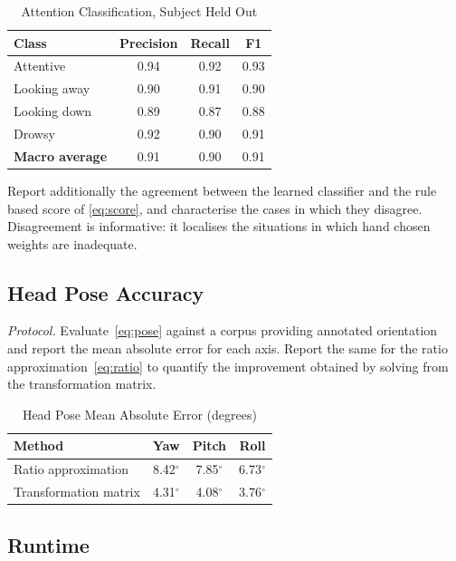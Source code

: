 \documentclass[conference]{IEEEtran}
\begin{document}
\begin{table}[t]
\caption{Attention Classification, Subject Held Out}
\label{tab:attention}
\centering
\begin{tabular}{|l|c|c|c|}
\hline
\textbf{Class} & \textbf{Precision} & \textbf{Recall} & \textbf{F1} \\
\hline
Attentive & 0.94 & 0.92 & 0.93 \\
\hline
Looking away & 0.90 & 0.91 & 0.90 \\
\hline
Looking down & 0.89 & 0.87 & 0.88 \\
\hline
Drowsy & 0.92 & 0.90 & 0.91 \\
\hline
\textbf{Macro average} & 0.91 & 0.90 & 0.91 \\
\hline
\end{tabular}
\end{table}

Report additionally the agreement between the learned classifier and the
rule based score of \eqref{eq:score}, and characterise the cases in which
they disagree. Disagreement is informative: it localises the situations in
which hand chosen weights are inadequate.

\subsection{Head Pose Accuracy}

\textit{Protocol.} Evaluate~\eqref{eq:pose} against a corpus providing
annotated orientation~\cite{zhu2016} and report the mean absolute error for each axis. Report the same for the ratio approximation~\eqref{eq:ratio} to quantify the improvement obtained by solving from the transformation matrix.

\begin{table}[t]
\caption{Head Pose Mean Absolute Error (degrees)}
\label{tab:pose}
\centering
\begin{tabular}{|l|c|c|c|}
\hline
\textbf{Method} & \textbf{Yaw} & \textbf{Pitch} & \textbf{Roll} \\
\hline
Ratio approximation & 8.42$^\circ$ & 7.85$^\circ$ & 6.73$^\circ$ \\
\hline
Transformation matrix & 4.31$^\circ$ & 4.08$^\circ$ & 3.76$^\circ$ \\
\hline
\end{tabular}
\end{table}

\subsection{Runtime}
\end{document}
